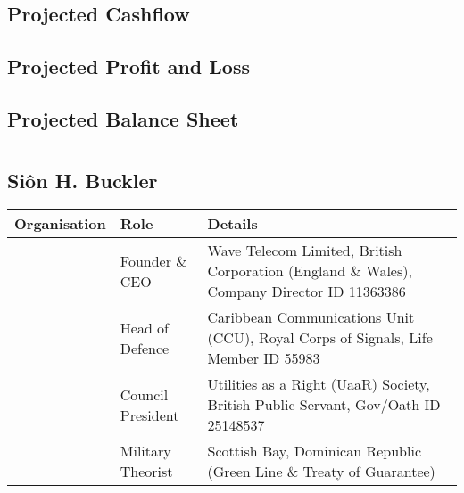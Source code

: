 \documentclass[letterpaper,10pt,openany,oneside,english]{sphinxmanual}
\begin{document}
\section{Projected Cashflow}
\label{\detokenize{reports:projected-cashflow}}

\section{Projected Profit and Loss}
\label{\detokenize{reports:projected-profit-and-loss}}

\section{Projected Balance Sheet}
\label{\detokenize{reports:projected-balance-sheet}}

\chapter{}
\label{\detokenize{index:document-author-s}}

\section{Siôn H. Buckler}
\label{\detokenize{index:sion-h-buckler}}

\begin{savenotes}\sphinxattablestart
\centering
\begin{tabulary}{\linewidth}[t]{|T|T|T|}
\hline
\sphinxstyletheadfamily 
Organisation
&\sphinxstyletheadfamily 
Role
&\sphinxstyletheadfamily 
Details
\\
\hline
\noindent{}
&
Founder \& CEO
&
Wave Telecom Limited, British Corporation (England \& Wales), Company Director ID 11363386
\\
\hline
\noindent{}
&
Head of Defence
&
Caribbean Communications Unit (CCU), Royal Corps of Signals, Life Member ID 55983
\\
\hline
\noindent{}
&
Council President
&
Utilities as a Right (UaaR) Society, British Public Servant, Gov/Oath ID 25148537
\\
\hline
\noindent{}
&
Military Theorist
&
Scottish Bay, Dominican Republic (Green Line \& Treaty of Guarantee)
\\
\hline
\end{tabulary}
\par
\sphinxattableend\end{savenotes}
\end{document}
